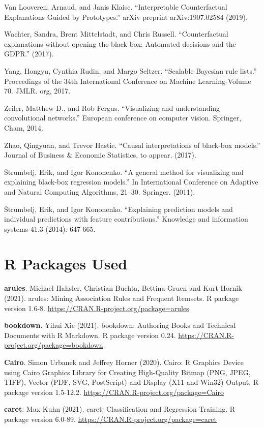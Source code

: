 \documentclass[
  12pt,
]{krantz}
\begin{document}
Van Looveren, Arnaud, and Janis Klaise. ``Interpretable Counterfactual Explanations Guided by Prototypes.'' arXiv preprint arXiv:1907.02584 (2019).

Wachter, Sandra, Brent Mittelstadt, and Chris Russell. ``Counterfactual explanations without opening the black box: Automated decisions and the GDPR.'' (2017).

Yang, Hongyu, Cynthia Rudin, and Margo Seltzer. ``Scalable Bayesian rule lists.'' Proceedings of the 34th International Conference on Machine Learning-Volume 70. JMLR. org, 2017.

Zeiler, Matthew D., and Rob Fergus. ``Visualizing and understanding convolutional networks.'' European conference on computer vision. Springer, Cham, 2014.

Zhao, Qingyuan, and Trevor Hastie. ``Causal interpretations of black-box models.'' Journal of Business \& Economic Statistics, to appear. (2017).

Štrumbelj, Erik, and Igor Kononenko. ``A general method for visualizing and explaining black-box regression models.'' In International Conference on Adaptive and Natural Computing Algorithms, 21--30. Springer. (2011).

Štrumbelj, Erik, and Igor Kononenko. ``Explaining prediction models and individual predictions with feature contributions.'' Knowledge and information systems 41.3 (2014): 647-665.

\hypertarget{r-packages-used}{%
\section*{R Packages Used}\label{r-packages-used}}


\textbf{arules}. Michael Hahsler, Christian Buchta, Bettina Gruen and Kurt Hornik (2021). arules: Mining Association Rules and Frequent Itemsets. R package version 1.6-8. \url{https://CRAN.R-project.org/package=arules}

\textbf{bookdown}. Yihui Xie (2021). bookdown: Authoring Books and Technical Documents with R Markdown. R package version 0.24. \url{https://CRAN.R-project.org/package=bookdown}

\textbf{Cairo}. Simon Urbanek and Jeffrey Horner (2020). Cairo: R Graphics Device using Cairo Graphics Library for Creating
High-Quality Bitmap (PNG, JPEG, TIFF), Vector (PDF, SVG,
PostScript) and Display (X11 and Win32) Output. R package version 1.5-12.2. \url{https://CRAN.R-project.org/package=Cairo}

\textbf{caret}. Max Kuhn (2021). caret: Classification and Regression Training. R package version 6.0-89. \url{https://CRAN.R-project.org/package=caret}
\end{document}
